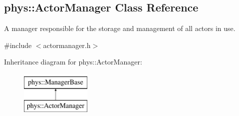 \hypertarget{classphys_1_1ActorManager}{
\subsection{phys::ActorManager Class Reference}
\label{classphys_1_1ActorManager}
}


A manager responsible for the storage and management of all actors in use.  




{\ttfamily \#include $<$actormanager.h$>$}

Inheritance diagram for phys::ActorManager:\begin{figure}[H]
\begin{center}
\leavevmode
\includegraphics[height=2.000000cm]{classphys_1_1ActorManager}
\end{center}
\end{figure}
